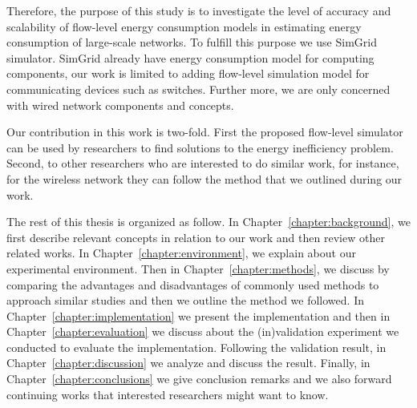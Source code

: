 Therefore, the purpose of this study is to investigate the level of accuracy and scalability of flow-level energy consumption models in estimating energy consumption of large-scale networks. To fulfill this purpose we use SimGrid simulator. SimGrid already have energy consumption model for computing components, our work is limited to adding flow-level simulation model for communicating devices such as switches. Further more, we are only concerned with wired network components and concepts. 

Our contribution in this work is two-fold. First the proposed flow-level simulator can be used by researchers to find solutions to the energy inefficiency problem. Second, to other researchers who are interested to do similar work, for instance, for the wireless network they can follow the method that we outlined during our work.  

The rest of this thesis is organized as follow. In Chapter~\ref{chapter:background}, we first describe relevant concepts in relation to our work and then review other related works. In Chapter~\ref{chapter:environment}, we explain about our experimental environment. Then in Chapter~\ref{chapter:methods}, we discuss by comparing the advantages and disadvantages of commonly used methods to approach similar studies and then we outline the method we followed. In Chapter~\ref{chapter:implementation} we present the implementation and then in Chapter~\ref{chapter:evaluation} we discuss about the (in)validation experiment we conducted to evaluate the implementation. Following the validation result, in Chapter~\ref{chapter:discussion} we analyze and discuss the result. Finally, in Chapter~\ref{chapter:conclusions} we give conclusion remarks and we also forward continuing works that interested researchers might want to know.


